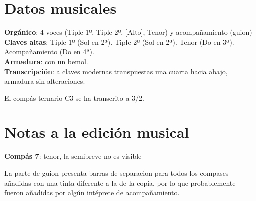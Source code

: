 
\section*{\centering\Large{Datos musicales}}
\noindent \textbf{Orgánico}: 4 voces (Tiple 1º, Tiple 2º, [Alto], Tenor) y acompañamiento (guion)\\
\textbf{Claves altas}: Tiple 1º (Sol en 2ª). Tiple 2º (Sol en 2ª). Tenor (Do en 3ª). Acompañamiento (Do en 4ª).\\
\textbf{Armadura}: con un bemol.\\
\textbf{Transcripción}: a claves modernas transpuestas una cuarta hacia abajo, armadura sin alteraciones.


\noindent El compás ternario C3 se ha transcrito a 3/2.

\section*{\centering\Large{Notas a la edición musical}}
\noindent \textbf{Compás 7}: tenor, la semibreve no es visible


\noindent La parte de guion presenta barras de separacion para todos los compases añadidas con una tinta diferente a la de la copia, por lo que probablemente fueron añadidas por algún intéprete de acompañamiento.


